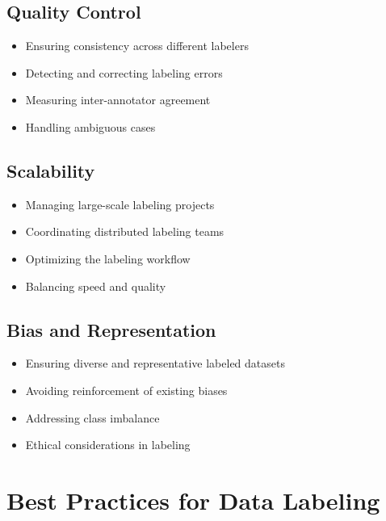 \documentclass[12pt]{article}
\begin{document}
\subsection{Quality Control}
\begin{itemize}
    \item Ensuring consistency across different labelers
    \item Detecting and correcting labeling errors
    \item Measuring inter-annotator agreement
    \item Handling ambiguous cases
\end{itemize}

\subsection{Scalability}
\begin{itemize}
    \item Managing large-scale labeling projects
    \item Coordinating distributed labeling teams
    \item Optimizing the labeling workflow
    \item Balancing speed and quality
\end{itemize}

\subsection{Bias and Representation}
\begin{itemize}
    \item Ensuring diverse and representative labeled datasets
    \item Avoiding reinforcement of existing biases
    \item Addressing class imbalance
    \item Ethical considerations in labeling
\end{itemize}

\section{Best Practices for Data Labeling}
\end{document}
